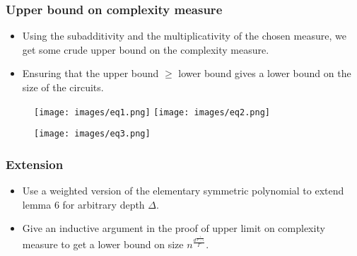 \documentclass{beamer}
\begin{document}
\begin{frame}[allowframebreaks]
\frametitle{Upper bound on complexity measure}
\begin{itemize}
    \item Using the subadditivity and the multiplicativity of the chosen measure, we get some crude upper bound on the complexity measure.
    \item Ensuring that the upper bound $\geq$ lower bound gives a lower bound on the size of the circuits.
    
    
\end{itemize}
\begin{figure}[H]
    \centering
    \texttt{[image: images/eq1.png]}
    \texttt{[image: images/eq2.png]}
\end{figure}

\begin{figure}[H]
    \centering
    \texttt{[image: images/eq3.png]}
\end{figure}
\end{frame}

\begin{frame}[allowframebreaks]
\frametitle{Extension}
\begin{itemize}
    \item Use a weighted version of the elementary symmetric polynomial to extend lemma 6 for arbitrary depth $\Delta$.
    \item Give an inductive argument in the proof of upper limit on complexity measure to get a lower bound on size $n^{\frac{d^{\frac{1}{2^{\Gamma}-1}}}{\Gamma}}$.
    
    
\end{itemize}
\end{frame}
\end{document}
